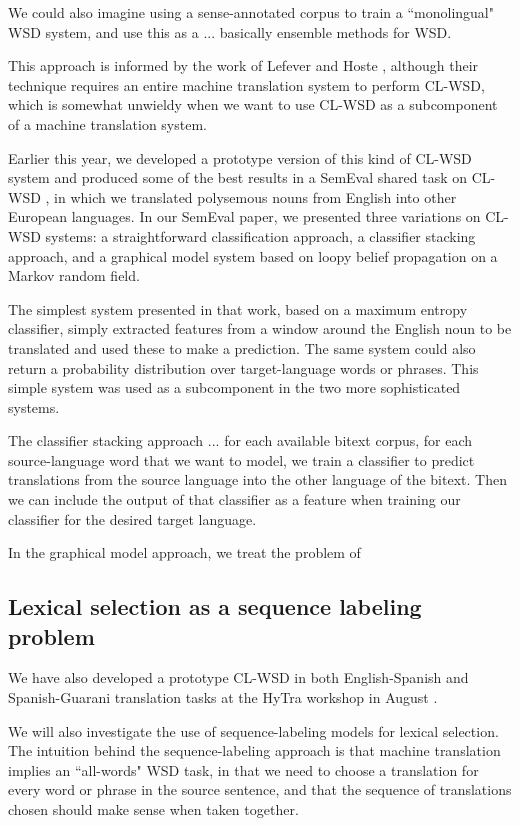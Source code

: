 We could also imagine using a sense-annotated corpus to train a ``monolingual"
WSD system, and use this as a 
... basically ensemble methods for WSD.

This approach is informed by the work of Lefever and Hoste
\cite{lefever-hoste-decock:2011:ACL-HLT2011}, although their technique requires
an entire machine translation system to perform CL-WSD, which is somewhat
unwieldy when we want to use CL-WSD as a subcomponent of a machine translation
system.

Earlier this year, we developed a prototype version of this kind of CL-WSD
system \cite{rudnick-liu-gasser:2013:SemEval-2013} and produced some of the
best results in a SemEval shared task on CL-WSD \cite{task10}, in which we
translated polysemous nouns from English into other European languages. In our
SemEval paper, we presented three variations on CL-WSD systems: a
straightforward classification approach, a classifier stacking approach, and a
graphical model system based on loopy belief propagation on a Markov random
field.

The simplest system presented in that work, based on a maximum entropy
classifier, simply extracted features from a window around the English noun to
be translated and used these to make a prediction. The same system could also
return a probability distribution over target-language words or phrases. This
simple system was used as a subcomponent in the two more sophisticated systems.


The classifier stacking approach ...
for each available bitext corpus, for each source-language word that we want to
model, we train a classifier to predict translations from the source language
into the other language of the bitext.
Then we can include the output of that classifier as a feature when training
our classifier for the desired target language.


In the graphical model approach, we treat the problem of 


\subsection{Lexical selection as a sequence labeling problem}

We have also developed a prototype
CL-WSD in both English-Spanish and Spanish-Guarani translation tasks at the
HyTra workshop in August \cite{rudnick-gasser:2013:HyTra-2013}.

We will also investigate the use of sequence-labeling models for
lexical selection.  The intuition behind the sequence-labeling approach is that
machine translation implies an ``all-words" WSD task, in that we need to choose
a translation for every word or phrase in the source sentence, and that the
sequence of translations chosen should make sense when taken together.

